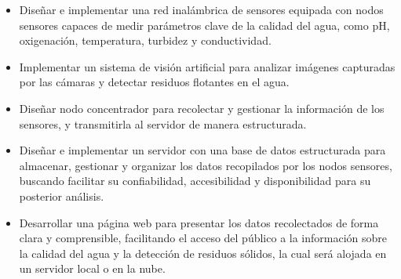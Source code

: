 \begin{itemize}
    \item Diseñar e implementar una red inalámbrica de sensores equipada con nodos sensores capaces de medir parámetros clave de la calidad del agua, como pH, oxigenación, temperatura, turbidez y conductividad. 
    \item Implementar un sistema de visión artificial para analizar imágenes capturadas por las cámaras y detectar residuos flotantes en el agua.
    \item Diseñar nodo concentrador para recolectar y gestionar la información de los sensores, y transmitirla al servidor de manera estructurada.
    \item Diseñar e implementar un servidor con una base de datos estructurada para almacenar, gestionar y organizar los datos recopilados por los nodos sensores, buscando facilitar su confiabilidad, accesibilidad y disponibilidad para su posterior análisis.
    
    \item Desarrollar una página web para presentar los datos recolectados de forma clara y comprensible, facilitando el acceso del público a la información sobre la calidad del agua y la detección de residuos sólidos, la cual será alojada en un servidor local o en la nube.

\end{itemize}
